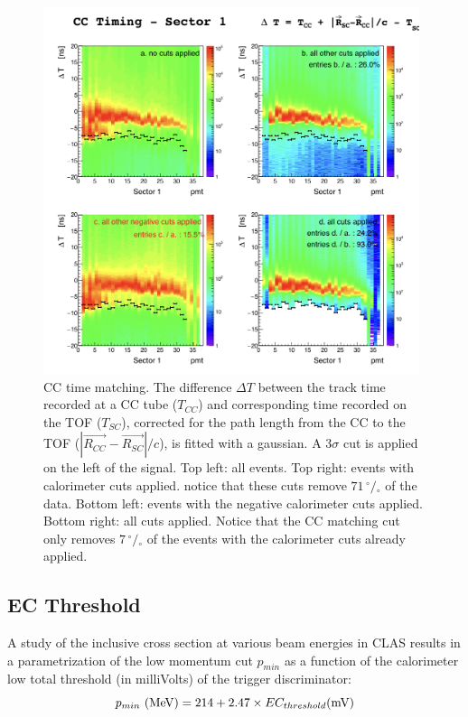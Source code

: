 \begin{figure}[h]
  \centering
		\includegraphics[width=0.98\textwidth]{img/cut-03cctimd_sector-1.png}
		\caption{CC time matching. The difference $\Delta T$ between the track time recorded
               at a CC tube ($T_{CC}$) and corresponding time recorded on the TOF ($T_{SC}$),
               corrected for the path length from the CC to the TOF ($|\vec{R_{CC}}-\vec{R_{SC}}|/c$),
               is fitted with a gaussian. A 3$\sigma$ cut is applied on the left of the signal.
               Top left: all events. Top right: events with calorimeter cuts applied.
               notice that these cuts remove $71 \,^{\circ\!\!}/\!_\circ$ of the data.
               Bottom left: events with the negative calorimeter cuts applied.
               Bottom right: all cuts applied. Notice that the CC matching cut
               only removes $7  \,^{\circ\!\!}/\!_\circ$ of the events with
               the calorimeter cuts already applied.}
 		\label{fig:cc_time_sec1}
\end{figure}


\clearpage\newpage


\clearpage\newpage
\subsection{EC Threshold}
A study \cite{bib:ecmin} of the inclusive cross section at various beam energies in CLAS 
results in a parametrization of the low momentum cut $p_{min}$ as a function of
the calorimeter low total threshold (in milliVolts) of the trigger discriminator:
\begin{equation}
 \label{eq:pmin} 
 p_{min}\,\,{\rm (MeV)} = 214 + 2.47\times EC_{threshold}{\rm (mV)}
\end{equation}

